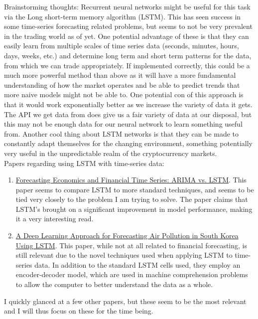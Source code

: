 \documentclass{article}
\begin{document}
Brainstorming thoughts: Recurrent neural networks might be useful for this task via the Long short-term memory algorithm (LSTM). This has seen success in some time-series forecasting related problems, but seems to not be very prevalent in the trading world as of yet. One potential advantage of these is that they can easily learn from multiple scales of time series data (seconds, minutes, hours, days, weeks, etc.) and determine long term and short term patterns for the data, from which we can trade appropriately. If implemented correctly, this could be a much more powerful method than above as it will have a more fundamental understanding of how the market operates and be able to predict trends that more naive models might not be able to. One potential con of this approach is that it would work exponentially better as we increase the variety of data it gets. The API we get data from does give us a fair variety of data at our disposal, but this may not be enough data for our neural network to learn something useful from. Another cool thing about LSTM networks is that they can be made to constantly adapt themselves for the changing environment, something potentially very useful in the unpredictable realm of the cryptocurrency markets. \\\newline
Papers regarding using LSTM with time-series data:
\begin{enumerate}
\item \href{https://arxiv.org/abs/1803.06386}{Forecasting Economics and Financial Time Series: ARIMA vs. LSTM}. This paper seems to compare LSTM to more standard techniques, and seems to be tied very closely to the problem I am trying to solve. The paper claims that LSTM's brought on a significant improvement in model performance, making it a very interesting read.
\item \href{https://arxiv.org/abs/1804.07891}{A Deep Learning Approach for Forecasting Air Pollution in South Korea Using LSTM}. This paper, while not at all related to financial forecasting, is still relevant due to the novel techniques used when applying LSTM to time-series data. In addition to the standard LSTM cells used, they employ an encoder-decoder model, which are used in machine comprehension problems to allow the computer to better understand the data as a whole. 
\end{enumerate}
I quickly glanced at a few other papers, but these seem to be the most relevant and I will thus focus on these for the time being.
\end{document}
